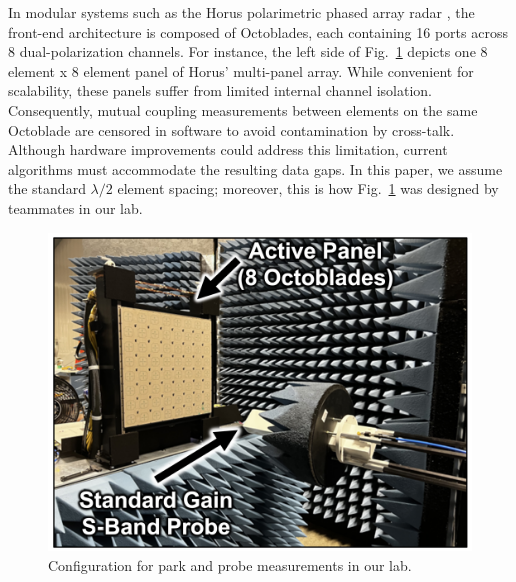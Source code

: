 \documentclass[journal]{IEEEtran}
\begin{document}
In modular systems such as the Horus polarimetric phased array radar \cite{horusgeneral,horuscal,yeary2021}, the front-end architecture is composed of Octoblades, each containing 16 ports across 8 dual-polarization channels. 
For instance, the left side of Fig.~\ref{fig:panel} depicts one 8 element x 8 element panel of Horus' multi-panel array.  While convenient for scalability, these panels suffer from limited internal channel isolation. Consequently, mutual coupling measurements between elements on the same Octoblade are censored in software to avoid contamination by cross-talk. Although hardware improvements could address this limitation, current algorithms must accommodate the resulting data gaps.  In this paper, we assume the standard $\lambda / 2$ element spacing; moreover, this is how Fig.~\ref{fig:panel} was designed by teammates in our lab.  


\begin{figure}[hptb]
    \centering
    \includegraphics[width=0.9\linewidth]{panel_measurement.png}
    \caption{Configuration for park and probe measurements in our lab.}
    \label{fig:panel}
\end{figure}




\end{document}
